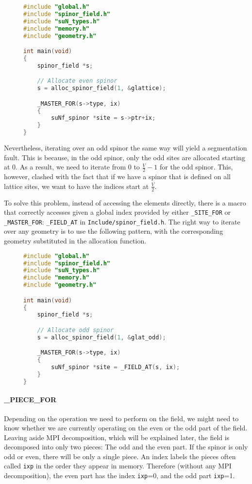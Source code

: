 \documentclass[12pt]{article}
\begin{document}
\begin{figure}[H]
\begin{lstlisting}[caption=To iterate over an even spinor is easy,language=C]
#include "global.h"
#include "spinor_field.h"
#include "suN_types.h"
#include "memory.h"
#include "geometry.h"

int main(void)
{
    spinor_field *s;

    // Allocate even spinor
    s = alloc_spinor_field(1, &glattice);

    _MASTER_FOR(s->type, ix)
    {
        suNf_spinor *site = s->ptr+ix;
    }
}
\end{lstlisting}
\end{figure}
Nevertheless, iterating over an odd spinor the same way will yield a segmentation fault. This is because, in the odd spinor, only the odd sites are allocated starting at 0. As a result, we need to iterate from 0 to $\tfrac{V}{2}-1$ for the odd spinor. This, however, clashed with the fact that if we have a spinor that is defined on all lattice sites, we want to have the indices start at $\tfrac{V}{2}$. \par
To solve this problem, instead of accessing the elements directly, there is a macro that correctly accesses given a global index provided by either \texttt{\_SITE\_FOR} or \texttt{\_MASTER\_FOR}: \texttt{\_FIELD\_AT} in \texttt{Include/spinor\_field.h}.
The right way to iterate over any geometry is to use the following pattern, with the corresponding geometry substituted in the allocation function.

\begin{figure}[H]
\begin{lstlisting}[caption=The right way to iterate over a spinor field,language=C]
#include "global.h"
#include "spinor_field.h"
#include "suN_types.h"
#include "memory.h"
#include "geometry.h"

int main(void)
{
    spinor_field *s;

    // Allocate odd spinor
    s = alloc_spinor_field(1, &glat_odd);

    _MASTER_FOR(s->type, ix)
    {
        suNf_spinor *site = _FIELD_AT(s, ix);
    }
}
\end{lstlisting}
\end{figure}

\paragraph{\_PIECE\_FOR} Depending on the operation we need to perform on the field, we might need to know whether we are currently operating on the even or the odd part of the field. Leaving aside MPI decomposition, which will be explained later, the field is decomposed into only two pieces: The odd and the even part. If the spinor is only odd or even, there will be only a single piece. An index labels the pieces often called \texttt{ixp} in the order they appear in memory. Therefore (without any MPI decomposition), the even part has the index \texttt{ixp}=0, and the odd part \texttt{ixp}=1.
\end{document}
